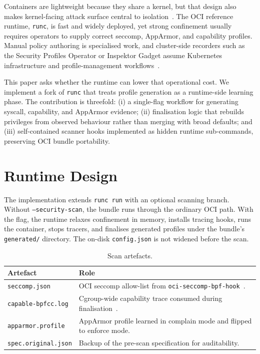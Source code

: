 \documentclass[runningheads]{llncs}
\begin{document}
Containers are lightweight because they share a kernel, but that design also makes kernel-facing attack surface central to isolation~\cite{wang2022,flauzac2020}. The OCI reference runtime, \texttt{runc}, is fast and widely deployed, yet strong confinement usually requires operators to supply correct seccomp, AppArmor, and capability profiles. Manual policy authoring is specialised work, and cluster-side recorders such as the Security Profiles Operator or Inspektor Gadget assume Kubernetes infrastructure and profile-management workflows~\cite{spo2025,inspektorgadget2025}.

This paper asks whether the runtime can lower that operational cost. We implement a fork of \texttt{runc} that treats profile generation as a runtime-side learning phase. The contribution is threefold: (i) a single-flag workflow for generating syscall, capability, and AppArmor evidence; (ii) finalisation logic that rebuilds privileges from observed behaviour rather than merging with broad defaults; and (iii) self-contained scanner hooks implemented as hidden runtime sub-commands, preserving OCI bundle portability.

\section{Runtime Design}\label{sec:implementation}

The implementation extends \texttt{runc run} with an optional scanning branch. Without \texttt{--security-scan}, the bundle runs through the ordinary OCI path. With the flag, the runtime relaxes confinement in memory, installs tracing hooks, runs the container, stops tracers, and finalises generated profiles under the bundle's \texttt{generated/} directory. The on-disk \texttt{config.json} is not widened before the scan.

\begin{table}
\caption{Scan artefacts.}
\label{tab:artefacts}
\centering
\begin{tabular}{p{3.6cm}p{7.6cm}}
\toprule
\textbf{Artefact} & \textbf{Role} \\
\midrule
\texttt{seccomp.json} & OCI seccomp allow-list from \texttt{oci-seccomp-bpf-hook}~\cite{ociseccompbpfhook}. \\
\texttt{capable-bpfcc.log} & Cgroup-wide capability trace consumed during finalisation~\cite{bcc2025}. \\
\texttt{apparmor.profile} & AppArmor profile learned in complain mode and flipped to enforce mode. \\
\texttt{spec.original.json} & Backup of the pre-scan specification for auditability. \\
\bottomrule
\end{tabular}
\end{table}
\end{document}
